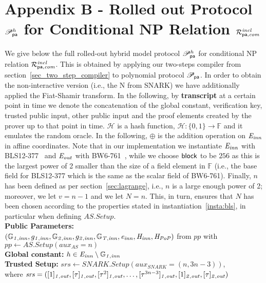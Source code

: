 \section{Appendix B - Rolled out Protocol $\mathscr{P}_{\mathsf{pa}}^{h}$ for Conditional NP Relation $\mathcal{R}^{\mathit{incl}}_{\mathsf{pa},\mathit{com}}$}
\label{sec:rolled_out}

\noindent  We give below the full rolled-out hybrid model protocol $\mathscr{P}_{\mathsf{pa}}^{h}$ for conditional NP relation $\mathcal{R}^{\mathit{incl}}_{\mathsf{pa},\mathit{com}}$. This is obtained by applying 
our two-steps compiler from section~\ref{sec_two_step_compiler} to polynomial protocol $\mathscr{P}_{\mathsf{pa}}$. In order to obtain the non-interactive version 
(i.e., the N from SNARK) we have additionally applied the Fiat-Shamir transform. In the following, by \textbf{transcript} at a certain point in time we denote the concatenation 
of the global constant, verification key, trusted public input, other public input and the proof elements created by the prover up to that point in time.
\noindent $\mathcal{H}$ is a hash function, $\mathcal{H}: \{0, 1\} \rightarrow \mathbb{F}$ and it emulates the random oracle.  
In the following, $\oplus$ is the addition operation on $\mathit{E}_{\mathit{inn}}$ in affine coordinates. Note that in our implementation we instantiate 
$\mathit{E}_{\mathit{inn}}$ with BLS12-377~\cite{zexe} and $\mathit{E}_{\mathit{out}}$ with BW6-761~\cite{BW6}, while we choose $\mathsf{block}$ to be $256$ as this is the largest power of 2 smaller 
than the size of a field element in $\mathbb{F}$ (i.e., the base field for BLS12-377 which is the same as the scalar field of BW6-761). 
Finally, $n$ has been defined as per section~\ref{sec:lagrange}, i.e., $n$ is a large enough power of 2; 
moreover, we let $v= n-1$ and we let $N = n$. This, in turn, ensures that $N$ has been chosen according to the properties stated in instantiation~\ref{insta:bls}, in particular 
when defining $\mathit{AS.Setup}$. \\

\noindent \textbf{Public Parameters:} \\
$(\mathbb{G}_{\mathit{1,inn}}, g_{\mathit{1,inn}}, \mathbb{G}_{\mathit{2,inn}}, g_{\mathit{2,inn}}, \mathbb{G}_{\mathit{T,inn}}, \mathit{e}_{\mathit{inn}}, \mathit{H}_{\mathit{inn}}, \mathit{H}_{\mathit{PoP}})$ from $\mathit{pp}$ with $\mathit{pp} \leftarrow \mathit{AS.Setup}(\mathit{aux_{\mathit{AS}}}= n)$ \\

\noindent \textbf{Global constant:} $h \in \mathit{E}_{\mathit{inn}} \setminus \mathbb{G}_{\mathit{1,inn}}$ \\ 

\noindent \textbf{Trusted Setup:} $\mathit{srs} \leftarrow \mathit{SNARK.Setup}(\mathit{aux_{\mathit{SNARK}}} = (n, 3n-3))$,\\ 
where $\mathit{srs} =([1]_{\mathit{1,out}}, [\tau]_{\mathit{1,out}}, [\tau^2]_{\mathit{1,out}}, \ldots, [\tau^{3n-3}]_{\mathit{1,out}}, [1]_{\mathit{2,out}}, [\tau]_{\mathit{2,out}})$ \\

